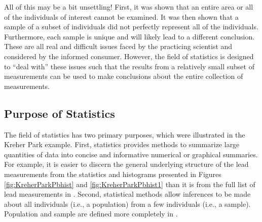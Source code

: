 \documentclass[10pt,openany]{book}\usepackage[]{graphicx}\usepackage[]{color}
\begin{document}

\vspace{-12pt}

All of this may be a bit unsettling!  First, it was shown that an entire area or all of the individuals of interest cannot be examined.  It was then shown that a sample of a subset of individuals did not perfectly represent all of the individuals.  Furthermore, each sample is unique and will likely lead to a different conclusion.  These are all real and difficult issues faced by the practicing scientist and considered by the informed consumer.  However, the field of statistics is designed to ``deal with'' these issues such that the results from a relatively small subset of measurements can be used to make conclusions about the entire collection of measurements.



\subsection{Purpose of Statistics}
The field of statistics has two primary purposes, which were illustrated in the Kreher Park example.  First, statistics provides methods to summarize large quantities of data into concise and informative numerical or graphical summaries.  For example, it is easier to discern the general underlying structure of the lead measurements from the statistics and histograms presented in Figures \ref{fig:KreherParkPbhist} and \ref{fig:KreherParkPbhist1} than it is from the full list of lead measurements in .  Second, statistical methods allow inferences to be made about all individuals (i.e., a population) from a few individuals (i.e., a sample).  Population and sample are defined more completely in .

\end{document}
